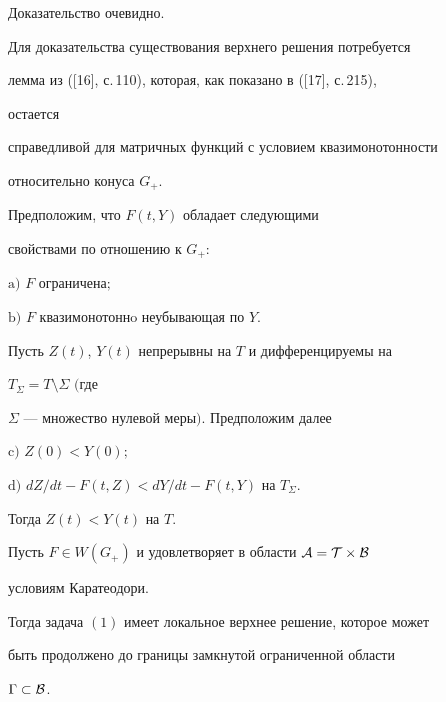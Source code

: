  


Доказательство очевидно. 


 


Для доказательства существования верхнего решения потребуется 


лемма из ([16], с.\,110), которая, как показано в ([17], с.\,215), 


остается 


справедливой для матричных функций с условием квазимонотонности 


относительно конуса $G_+$. 


 


\begin{lem} 


Предположим, что $F(t,Y)$ обладает следующими 


свойствами по отношению к $G_+:$ 


 


$\mathrm a)$ $F$ ограничена$;$ 


 


$\mathrm b)$ $F$ квазимонотоннo неубывающая по $Y$. 


 


\noindent{}Пусть $Z(t)$, $Y(t)$ непрерывны на $T$ и дифференцируемы на 


$T_\Sigma=T\setminus\Sigma$ $($где 


$\Sigma$ --- множество нулевой меры$)$. Предположим далее 


 


$\mathrm c)$ $Z(0)<Y(0);$ 


 


$\mathrm d)$ $d Z/d t-F(t,Z)<d Y/ d t-F(t,Y)$ на $T_\Sigma$. 


 


\noindent{}Тогда $Z(t)<Y(t)$ на $T$. 


\end{lem} 


 


\begin{thm} 


Пусть $F\in W(G_+)$ и удовлетворяет в области $\cal A=T\times\cal B$ 


условиям Каратеодори. 


Тогда задача $(1)$ имеет локальное верхнее решение, которое может 


быть продолжено до границы замкнутой ограниченной области 


$\Gamma\subset\cal B$. 


\end{thm} 


